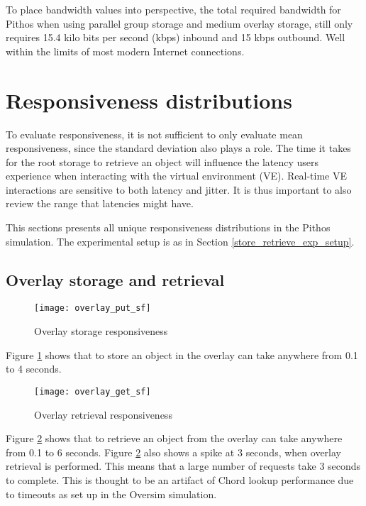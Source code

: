 To place bandwidth values into perspective, the total required bandwidth for Pithos when using parallel group storage and medium overlay storage, still only requires 15.4 kilo bits per second (kbps) inbound and 15 kbps outbound. Well within the limits of most modern Internet connections.

\section{Responsiveness distributions}

To evaluate responsiveness, it is not sufficient to only evaluate mean responsiveness, since the standard deviation also plays a role. The time it takes for the root storage to retrieve an object will influence the latency users experience when interacting with the virtual environment (VE). Real-time VE interactions are sensitive to both latency and jitter. It is thus important to also review the range that latencies might have.

This sections presents all unique responsiveness distributions in the Pithos simulation. The experimental setup is as in Section \ref{store_retrieve_exp_setup}.

\subsection{Overlay storage and retrieval}

\begin{figure}[htbp]
 \centering
 \texttt{[image: overlay\_put\_sf]}
 \caption{Overlay storage responsiveness}
 \label{fig_overlay_put_sf}
\end{figure}
%
Figure \ref{fig_overlay_put_sf} shows that to store an object in the overlay can take anywhere from 0.1 to 4 seconds.

\begin{figure}[htbp]
 \centering
 \texttt{[image: overlay\_get\_sf]}
 \caption{Overlay retrieval responsiveness}
 \label{fig_overlay_get_sf}
\end{figure}
%
Figure \ref{fig_overlay_get_sf} shows that to retrieve an object from the overlay can take anywhere from 0.1 to 6 seconds. Figure \ref{fig_overlay_get_sf} also shows a spike at 3 seconds, when overlay retrieval is performed. This means that a large number of requests take 3 seconds to complete. This is thought to be an artifact of Chord lookup performance due to timeouts as set up in the Oversim simulation.

